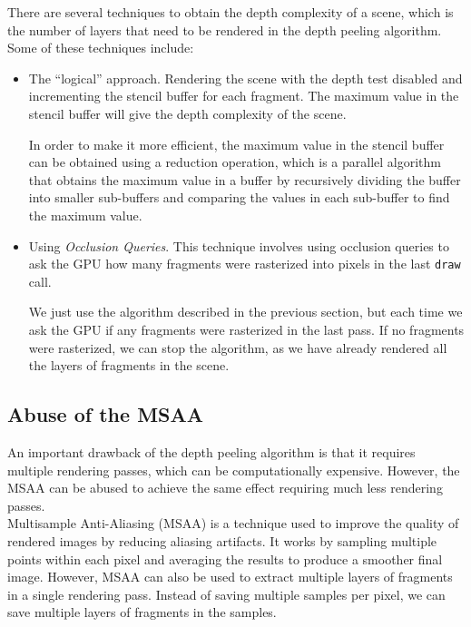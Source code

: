 There are several techniques to obtain the depth complexity of a scene, which is the number of layers that need to be rendered in the depth peeling algorithm. Some of these techniques include:
\begin{itemize}
    \item The ``logical'' approach. Rendering the scene with the depth test disabled and incrementing the stencil buffer for each fragment. The maximum value in the stencil buffer will give the depth complexity of the scene.
    
    In order to make it more efficient, the maximum value in the stencil buffer can be obtained using a reduction operation, which is a parallel algorithm that obtains the maximum value in a buffer by recursively dividing the buffer into smaller sub-buffers and comparing the values in each sub-buffer to find the maximum value.

    \item Using \emph{Occlusion Queries}. This technique involves using occlusion queries to ask the GPU how many fragments were rasterized into pixels in the last \texttt{draw} call.
    
    We just use the algorithm described in the previous section, but each time we ask the GPU if any fragments were rasterized in the last pass. If no fragments were rasterized, we can stop the algorithm, as we have already rendered all the layers of fragments in the scene.
\end{itemize}

\subsection{Abuse of the MSAA}

An important drawback of the depth peeling algorithm is that it requires multiple rendering passes, which can be computationally expensive. However, the MSAA can be abused to achieve the same effect requiring much less rendering passes.\\

Multisample Anti-Aliasing (MSAA) is a technique used to improve the quality of rendered images by reducing aliasing artifacts. It works by sampling multiple points within each pixel and averaging the results to produce a smoother final image. However, MSAA can also be used to extract multiple layers of fragments in a single rendering pass. Instead of saving multiple samples per pixel, we can save multiple layers of fragments in the samples.\\

